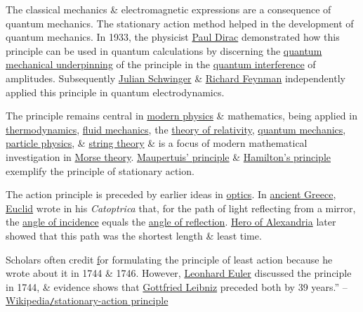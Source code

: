 \documentclass[oneside]{book}
\numberwithin{equation}{section}
\begin{document}
The classical mechanics \& electromagnetic expressions are a consequence of quantum mechanics. The stationary action method helped in the development of quantum mechanics. In 1933, the physicist \href{https://en.wikipedia.org/wiki/Paul_Dirac}{Paul Dirac} demonstrated how this principle can be used in quantum calculations by discerning the \href{https://en.wikipedia.org/wiki/Path_integral_formulation#Quantum_action_principle}{quantum mechanical underpinning} of the principle in the \href{https://en.wikipedia.org/wiki/Interference_(wave_propagation)#Quantum_interference}{quantum interference} of amplitudes. Subsequently \href{https://en.wikipedia.org/wiki/Julian_Schwinger}{Julian Schwinger} \& \href{https://en.wikipedia.org/wiki/Richard_Feynman}{Richard Feynman} independently applied this principle in quantum electrodynamics.

The principle remains central in \href{https://en.wikipedia.org/wiki/Modern_physics}{modern physics} \& mathematics, being applied in \href{https://en.wikipedia.org/wiki/Thermodynamics}{thermodynamics}, \href{https://en.wikipedia.org/wiki/Fluid_mechanics}{fluid mechanics}, the \href{https://en.wikipedia.org/wiki/Theory_of_relativity}{theory of relativity}, \href{https://en.wikipedia.org/wiki/Quantum_mechanics}{quantum mechanics}, \href{https://en.wikipedia.org/wiki/Particle_physics}{particle physics}, \& \href{https://en.wikipedia.org/wiki/String_theory}{string theory} \& is a focus of modern mathematical investigation in \href{https://en.wikipedia.org/wiki/Morse_theory}{Morse theory}. \href{https://en.wikipedia.org/wiki/Maupertuis%27_principle}{Maupertuis' principle} \& \href{https://en.wikipedia.org/wiki/Hamilton%27s_principle}{Hamilton's principle} exemplify the principle of stationary action.

The action principle is preceded by earlier ideas in \href{https://en.wikipedia.org/wiki/Optics}{optics}. In \href{https://en.wikipedia.org/wiki/Ancient_Greece}{ancient Greece}, \href{https://en.wikipedia.org/wiki/Euclid}{Euclid} wrote in his \textit{Catoptrica} that, for the path of light reflecting from a mirror, the \href{https://en.wikipedia.org/wiki/Angle_of_incidence_(optics)}{angle of incidence} equals the \href{https://en.wikipedia.org/wiki/Angle_of_reflection}{angle of reflection}. \href{https://en.wikipedia.org/wiki/Hero_of_Alexandria}{Hero of Alexandria} later showed that this path was the shortest length \& least time.

Scholars often credit \href{Pierre Louis Maupertuis} for formulating the principle of least action because he wrote about it in 1744 \& 1746. However, \href{https://en.wikipedia.org/wiki/Leonhard_Euler}{Leonhard Euler} discussed the principle in 1744, \& evidence shows that \href{https://en.wikipedia.org/wiki/Gottfried_Leibniz}{Gottfried Leibniz} preceded both by 39 years.'' -- \href{https://en.wikipedia.org/wiki/Stationary-action_principle}{Wikipedia\texttt{/}stationary-action principle}
\end{document}

